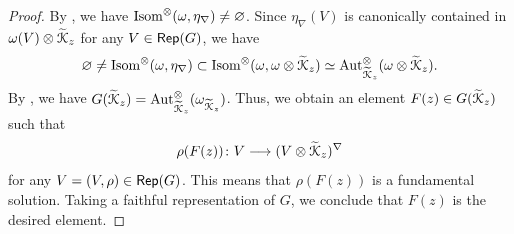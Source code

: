 \documentclass[final,reqno]{amsart}
\begin{document}
\begin{proof}
    By \cite[Theorem~1.2]{Wib25}, we have $\operatorname{Isom}^\otimes(\omega,\eta_\nabla)\neq\varnothing$. Since $\eta_\nabla(V)$ is canonically contained in $\omega(V)\otimes\widetilde{\EuScript{K}}_z$ for any $V\in\mathsf{Rep}(G)$, we have
    \[
        \varnothing\neq\operatorname{Isom}^\otimes(\omega,\eta_\nabla)\subset\operatorname{Isom}^\otimes(\omega,\omega\otimes\widetilde{\EuScript{K}}_z)\simeq \operatorname{Aut}^\otimes_{\widetilde{\EuScript{K}}_z}(\omega\otimes\widetilde{\EuScript{K}}_z).
    \]
    By \cite[Proposition~2.8]{DM82}, we have $G(\widetilde{\EuScript{K}}_z)= \operatorname{Aut}^\otimes_{\widetilde{\EuScript{K}}_z}(\omega_{\widetilde{\EuScript{K}}_z})$. Thus, we obtain an element $F(z)\in G(\widetilde{\EuScript{K}}_z)$ such that
    \[
        \rho(F(z))\colon V\longrightarrow (V\otimes\widetilde{\EuScript{K}}_z)^\nabla  
    \]
    for any $V=(V,\rho)\in\mathsf{Rep}(G)$. This means that $\rho(F(z))$ is a fundamental solution. Taking a faithful representation of $G$, we conclude that $F(z)$ is the desired element.
\end{proof}




\end{document}

